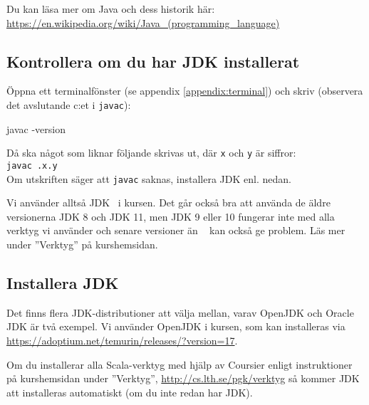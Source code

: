 \noindent Du kan läsa mer om Java och dess historik här: \\
\href{https://en.wikipedia.org/wiki/Java_(programming_language)}{https://en.wikipedia.org/wiki/Java\_(programming\_language)}

\subsection{Kontrollera om du har JDK installerat}\label{appendix:compile:check-jdk}

Öppna ett terminalfönster (se appendix \ref{appendix:terminal}) och skriv (observera det avslutande c:et i \texttt{javac}):
\begin{REPLnonum}
javac -version
\end{REPLnonum}
Då ska något som liknar följande skrivas ut, där \texttt{x} och \texttt{y} är siffror:\\
\texttt{javac \JDKVersion.x.y}\\
Om utskriften säger att \texttt{javac} saknas, installera JDK enl. nedan.

Vi använder alltså JDK \JDKVersion~i kursen. Det går också bra att använda de äldre versionerna JDK 8 och JDK 11, men JDK 9 eller 10 fungerar inte med alla verktyg vi använder och senare versioner än \JDKVersion~ kan också ge problem. Läs mer under ''Verktyg'' på kurshemsidan.






\subsection{Installera JDK}\label{appendix:compile:install-jdk}

Det finns flera JDK-distributioner att välja mellan, varav OpenJDK och Oracle JDK är två exempel. Vi använder OpenJDK i kursen, som kan installeras via \\ \url{https://adoptium.net/temurin/releases/?version=17}. 

Om du installerar alla Scala-verktyg med hjälp av Coursier enligt instruktioner på kurshemsidan under ''Verktyg'', \url{http://cs.lth.se/pgk/verktyg} så kommer JDK att installeras automatiskt (om du inte redan har JDK). %

